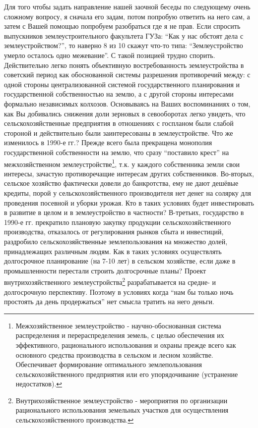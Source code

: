\begin{drama}
Для того чтобы задать направление нашей заочной беседы по следующему очень сложному вопросу, я сначала его задам, потом попробую ответить на него сам, а затем с Вашей помощью попробуем разобраться где я не прав. 
Если спросить выпускников землеустроительного факультета ГУЗа: “Как у нас обстоят дела с землеустройством?”, то наверно 8 из 10 скажут что-то типа: “Землеустройство умерло осталось одно межевание”. С такой позицией трудно спорить. Действительно легко понять объективную востребованность землеустройства в советский период как обоснованной системы разрешения противоречий между: с одной стороны централизованной системой государственного планирования и государственной собственностью на землю, а с другой стороны интересами формально независимых колхозов. Основываясь на Ваших воспоминаниях о том, как Вы добивались снижения доли зерновых в севооборотах легко увидеть, что сельскохозяйственные предприятия в отношениях с госпланом были слабой стороной и действительно были заинтересованы в землеустройстве. 
Что же изменилось в 1990-е гг.? Прежде всего была прекращена монополия государственной собственности на землю, что сразу “поставило крест” на межхозяйственном землеустройстве\footnote{Межхозяйственное землеустройство - научно-обоснованная система распределения и перераспределения земель, с целью обеспечения их эффективного, рационального использования и охраны прежде всего как основного средства производства в сельском и лесном хозяйстве. Обеспечивает формирование оптимального землепользования сельскохозяйственного предприятия или его упорядочивание (устранение недостатков).}, т.к. у каждого собственника земли свои интересы, зачастую противоречащие интересам других собственников.
Во-вторых, сельское хозяйство фактически довели до банкротства, ему не дают дешёвые кредиты, порой у сельскохозяйственного производителя нет денег на солярку для проведения посевной и уборки урожая. Кто в таких условиях будет инвестировать в развитие в целом и в землеустройство в частности?
В-третьих, государство в 1990-е гг. прекратило плановую закупку продукции сельскохозяйственного производства, отказалось от регулирования рынков сбыта и инвестиций, раздробило сельскохозяйственные землепользования на множество долей, принадлежащих различным людям. Как в таких условиях осуществлять долгосрочное планирование (на 7-10 лет) в сельском хозяйстве, если даже в промышленности перестали строить долгосрочные планы? Проект внутрихозяйственного землеустройства\footnote{Внутрихозяйственное землеустройство - мероприятия по организации рационального использования земельных участков для осуществления сельскохозяйственного производства.} разрабатывается на средне- и долгосрочную перспективу. Поэтому в условиях когда “нам бы только ночь простоять да день продержаться” нет смысла тратить на него деньги.

\end{drama}
